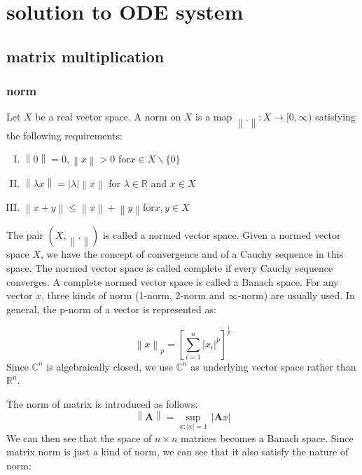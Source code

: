 \documentclass[a4paper]{article}
\newenvironment{enumerateromancap}{\begin{enumerate}[I.] }{\end{enumerate}}
\begin{document}
\section{solution to ODE system {\cite{Teschl}}{\cite{He&Peng}}}

\subsection{matrix multiplication}
\subsubsection{norm}

Let $X$ be a real vector space. A norm on $X$ is a map $\left\| . \right\|:X\to [0,\infty )$ satisfying the following requirements:

\begin{enumerateromancap}
  \item $\left\| 0 \right\|=0,\left\| x \right\|>0$ for$x\in X\backslash \{0\}$
  \item $\left\| \lambda x \right\|=\left| \lambda  \right|\left\| x \right\|$ for $\lambda \in \mathbb{R}$ and $x\in X$
  \item $\left\| x+y \right\|\le \left\| x \right\|+\left\| y \right\|$for$x,y\in X$
\end{enumerateromancap}

The pair $\left( X,\left\| . \right\| \right)$  is called a normed vector space. Given a normed vector space $X$, we have the concept of convergence and of a Cauchy sequence in this space. The normed vector space is called complete if every Cauchy sequence converges. A complete normed vector space is called a Banach space.
For any vector $x$, three kinds of norm (1-norm, 2-norm and $\infty$-norm) are usually used. In general, the p-norm of a vector is represented as:

\begin{equation}
{{\left\| x \right\|}_{p}}={{\left[ \sum\limits_{i=1}^{n}{{{\left| {{x}_{i}} \right|}^{p}}} \right]}^{\frac{1}{p}}}
\end{equation}
Since ${{\mathbb{C}}^{n}}$ is algebraically closed, we use ${{\mathbb{C}}^{n}}$  as underlying vector space rather than ${{\mathbb{R}}^{n}}$.

The norm of matrix is introduced as follows:
\begin{equation}
\left\| \mathbf{A} \right\|=\underset{x:\left| x \right|=1}{\mathop{\sup }}\,\left| \mathbf{A}x \right|
\end{equation}
We can then see that the space of $n\times n$ matrices becomes a Banach space.
Since matrix norm is just a kind of norm, we can see that it also satisfy the nature of norm:
\end{document}

